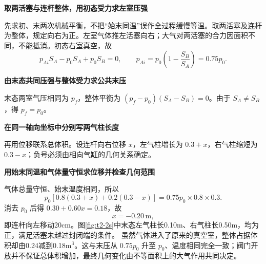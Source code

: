 \begin{solution}\textbf{取两活塞与连杆整体，用初态受力求左室压强}\par\nobreak
先求初、末两次机械平衡，不把“始末同温”误作全过程缓慢等温。取两活塞及连杆为整体，规定向右为正。左室气体推左活塞向右；大气对两活塞的合力因面积不同，不能抵消。初态右室真空，故
\[p_{Ai}S_A-p_0S_A+p_0S_B=0,\qquad p_{Ai}=p_0\left(1-\frac{S_B}{S_A}\right)=0.75p_0.\]


\par\medskip{}\noindent\textbf{由末态共同压强与整体受力求公共末压}\par\nobreak
末态两室气压相同为 $p_f$，整体平衡为 $(p_f-p_0)(S_A-S_B)=0$。由于 $S_A\ne S_B$，得 $p_f=p_0$。


\par\medskip{}\noindent\textbf{在同一轴向坐标中分别写两气柱长度}\par\nobreak
再用位移联系总体积。设连杆向右位移 $x$，左气柱增长为 $0.3+x$，右气柱缩短为 $0.3-x$；负号必须由相向气缸的几何关系确定。



\par\medskip{}\noindent\textbf{用始末同温和气体量守恒求位移并检查几何范围}\par\nobreak
气体总量守恒、始末温度相同，所以
\[p_0[0.8(0.3+x)+0.2(0.3-x)]
=0.75p_0\times0.8\times0.3.\]
消去 $p_0$ 后得 $0.30+0.60x=0.18$，故
\[\boxed{x=-0.20\,\mathrm m},\]
即连杆向左移动20cm。图\ref{fig:t2-2s}中末态左气柱长0.10m、右气柱长0.50m，均为正，满足活塞未越过封闭端的条件。
虽然气体进入了原来的真空室，整体占据体积却由0.24减到0.18m$^3$。这与末压从 $0.75p_0$ 升至 $p_0$、温度相同完全一致；阀门开放并不保证总体积增加，最终几何变化由不等面积上的大气作用共同决定。
\end{solution}
